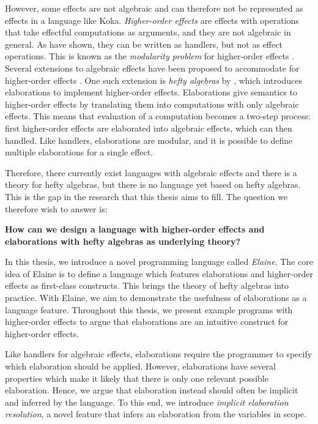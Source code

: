 However, some effects are not algebraic and can therefore not be represented as effects in a language like Koka. \emph{Higher-order effects} are effects with operations that take effectful computations as arguments, and they are not algebraic in general. As \textcite{castagna_handlers_2009} have shown, they can be written as handlers, but not as effect operations. This is known as the \emph{modularity problem} for higher-order effects \autocite{wu_effect_2014}. Several extensions to algebraic effects have been proposed to accommodate for higher-order effects \autocite{wu_effect_2014,oh_latent_2021}. One such extension is \emph{hefty algebras} by \textcite{bach_poulsen_hefty_2023}, which introduces elaborations to implement higher-order effects. Elaborations give semantics to higher-order effects by translating them into computations with only algebraic effects. This means that evaluation of a computation becomes a two-step process: first higher-order effects are elaborated into algebraic effects, which can then handled. Like handlers, elaborations are modular, and it is possible to define multiple elaborations for a single effect.

Therefore, there currently exist languages with algebraic effects and there is a theory for hefty algebras, but there is no language yet based on hefty algebras. This is the gap in the research that this thesis aims to fill. The question we therefore wish to answer is:
\begin{center}
\textbf{How can we design a language with higher-order effects and elaborations with hefty algebras as underlying theory?}
\end{center}
In this thesis, we introduce a novel programming language called \emph{Elaine}. The core idea of Elaine is to define a language which features elaborations and higher-order effects as first-class constructs. This brings the theory of hefty algebras into practice. With Elaine, we aim to demonstrate the usefulness of elaborations as a language feature. Throughout this thesis, we present example programs with higher-order effects to argue that elaborations are an intuitive construct for higher-order effects.

Like handlers for algebraic effects, elaborations require the programmer to specify which elaboration should be applied. However, elaborations have several properties which make it likely that there is only one relevant possible elaboration. Hence, we argue that elaboration instead should often be implicit and inferred by the language. To this end, we introduce \emph{implicit elaboration resolution}, a novel feature that infers an elaboration from the variables in scope.

